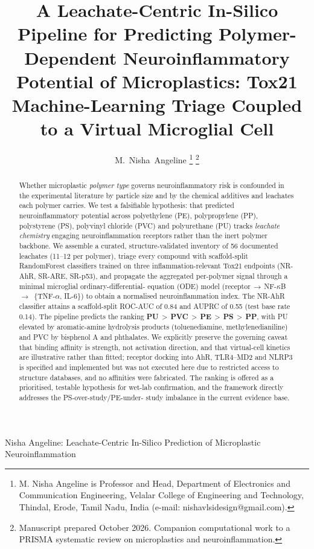 \documentclass[journal]{IEEEtran}
\begin{document}
\title{A Leachate-Centric In-Silico Pipeline for Predicting Polymer-Dependent
Neuroinflammatory Potential of Microplastics: Tox21 Machine-Learning Triage
Coupled to a Virtual Microglial Cell}

\author{M.~Nisha~Angeline%
\thanks{M. Nisha Angeline is Professor and Head, Department of Electronics and
Communication Engineering, Velalar College of Engineering and Technology,
Thindal, Erode, Tamil Nadu, India (e-mail: nishavlsidesign@gmail.com).}%
\thanks{Manuscript prepared October 2026. Companion computational work to a
PRISMA systematic review on microplastics and neuroinflammation.}}

%
{Nisha Angeline: Leachate-Centric In-Silico Prediction of Microplastic Neuroinflammation}

\maketitle

\begin{abstract}
Whether microplastic \emph{polymer type} governs neuroinflammatory risk is
confounded in the experimental literature by particle size and by the chemical
additives and leachates each polymer carries. We test a falsifiable hypothesis:
that predicted neuroinflammatory potential across polyethylene (PE),
polypropylene (PP), polystyrene (PS), polyvinyl chloride (PVC) and polyurethane
(PU) tracks \emph{leachate chemistry} engaging neuroinflammation receptors rather
than the inert polymer backbone. We assemble a curated, structure-validated
inventory of 56 documented leachates (11--12 per polymer), triage every compound
with scaffold-split RandomForest classifiers trained on three
inflammation-relevant Tox21 endpoints (NR-AhR, SR-ARE, SR-p53), and propagate the
aggregated per-polymer signal through a minimal microglial ordinary-differential-
equation (ODE) model (receptor\,$\rightarrow$\,NF-$\kappa$B\,$\rightarrow$\,
\{TNF-$\alpha$, IL-6\}) to obtain a normalised neuroinflammation index. The
NR-AhR classifier attains a scaffold-split ROC-AUC of 0.84 and AUPRC of 0.55
(test base rate 0.14). The pipeline predicts the ranking
\textbf{PU\,$>$\,PVC\,$>$\,PE\,$>$\,PS\,$>$\,PP}, with PU elevated by
aromatic-amine hydrolysis products (toluenediamine, methylenedianiline) and PVC
by bisphenol A and phthalates. We explicitly preserve the governing caveat that
binding affinity is strength, not activation direction, and that virtual-cell
kinetics are illustrative rather than fitted; receptor docking into AhR,
TLR4--MD2 and NLRP3 is specified and implemented but was not executed here due to
restricted access to structure databases, and no affinities were fabricated. The
ranking is offered as a prioritised, testable hypothesis for wet-lab
confirmation, and the framework directly addresses the PS-over-study/PE-under-
study imbalance in the current evidence base.
\end{abstract}
\end{document}
